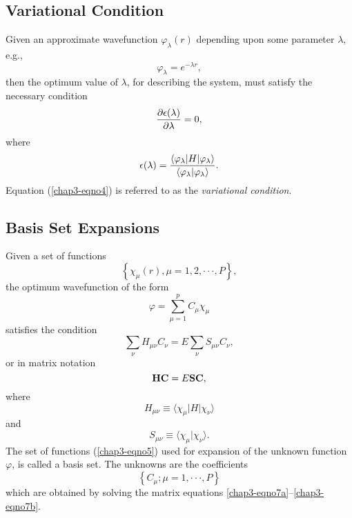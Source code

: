\subsection{Variational Condition}

Given an approximate wavefunction $\varphi_{\lambda}(r)$  depending upon 
some parameter $\lambda$, e.g.,
\begin{equation}
\varphi_{\lambda} = e^{- \lambda r} ,
\end{equation}
then the optimum value of $\lambda$, for describing the system, must satisfy 
the necessary condition
\begin{equation}
{\partial \epsilon ( \lambda ) \over \partial \lambda} = 0 ,
\label{chap3-eqno4}
\end{equation}
where
\begin{equation}
\epsilon ( \lambda ) = {\langle \varphi_{\lambda} \vert H \vert 
\varphi_{\lambda} \rangle \over \langle \varphi_{\lambda} \vert 
\varphi_{\lambda} \rangle} .
\end{equation}
Equation (\ref{chap3-eqno4}) is referred to as the \emph{variational
condition}.

\subsection{Basis Set Expansions}

Given a set of functions
\begin{equation}
\left\{ \chi_{\mu} ( r ) , \mu = 1 , 2 , \cdot \cdot \cdot , P 
\right\} ,
\label{chap3-eqno5}
\end{equation}
the optimum wavefunction of the form
\begin{equation}
\varphi = \sum^{p}_{\mu = 1} C_{\mu} \chi_{\mu}
\label{chap3-eqno6}
\end{equation}
satisfies the condition
\begin{equation}
\sum_{\nu} H_{\mu \nu} C_{\nu} = E \sum_{\nu} S_{\mu \nu} C_{\nu},
\label{chap3-eqno7a}
\end{equation}
or in matrix notation
\begin{equation}
{\bf H} {\bf C} = E {\bf S} {\bf C},
\label{chap3-eqno7b}
\end{equation}
where
\begin{equation}
H_{\mu \nu} \equiv \langle \chi_{\mu} \vert H \vert \chi_{\nu} 
\rangle 
\label{chap3-eqno8a}
\end{equation}
and
\begin{equation}
S_{\mu \nu} \equiv \langle \chi_{\mu} \vert \chi_{\nu} \rangle 
.
\label{chap3-eqno8b}
\end{equation}
The set of functions (\ref{chap3-eqno5}) used for expansion of the
unknown function $\varphi$, is called a basis set. The unknowns are
the coefficients
\begin{equation}
\left\{ C_{\mu} ; \mu = 1 , \cdot \cdot \cdot , P \right\}
\end{equation}
which are obtained by solving the matrix equations
\ref{chap3-eqno7a}--\ref{chap3-eqno7b}. 

